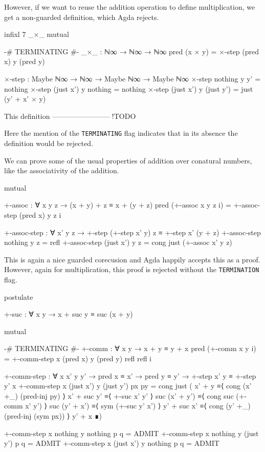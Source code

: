 However, if we want to reuse the addition operation to define multiplication, we get a non-guarded definition, which Agda rejects.

\begin{code}[hide]
infixl 7 _×_
mutual
\end{code}
\begin{code}
  {-# TERMINATING #-}
  _×_ : ℕ∞ → ℕ∞ → ℕ∞
  pred (x × y) = ×-step (pred x) y (pred y)

  ×-step :
    Maybe ℕ∞ → ℕ∞ → Maybe ℕ∞ → Maybe ℕ∞
  ×-step nothing    y y'         = nothing
  ×-step (just x')  y nothing    = nothing
  ×-step (just x')  y (just y')  = just (y' + x' × y)
\end{code}

This definition ------------------------ !TODO

Here the mention of the \texttt{TERMINATING} flag indicates that in its absence the definition would be rejected.

We can prove some of the usual properties of addition over conatural numbers, like the associativity of the addition.

\begin{code}[hide]
mutual
\end{code}
\begin{code}
  +-assoc : ∀ x y z → (x + y) + z ≡ x + (y + z)
  pred (+-assoc x y z i) = +-assoc-step (pred x) y z i

  +-assoc-step :
    ∀ x' y z →
    +-step (+-step x' y) z ≡ +-step x' (y + z)
  +-assoc-step nothing    y z = refl
  +-assoc-step (just x')  y z = cong just (+-assoc x' y z)
\end{code}

This is again a nice guarded corecusion and Agda happily accepts this as a proof. However, again for multiplication, this proof is rejected without the \texttt{TERMINATION} flag.

\begin{code}[hide]
postulate
\end{code}
\begin{code}
  +-suc : ∀ x y → x + suc y ≡ suc (x + y)
\end{code}

\begin{code}[hide]
mutual
\end{code}
\begin{code}
  {-# TERMINATING #-}
  +-comm : ∀ x y → x + y ≡ y + x
  pred (+-comm x y i) =
    +-comm-step x (pred x) y (pred y) refl refl i

  +-comm-step :
    ∀ x x' y y' → pred x ≡ x' → pred y ≡ y' →
    +-step x' y ≡ +-step y' x
  +-comm-step x (just x') y (just y') px py =
    cong just
      ( x' + y         ≡⟨ cong (x' +_) (pred-inj py) ⟩
        x' + suc y'    ≡⟨ +-suc x' y' ⟩
        suc (x' + y')  ≡⟨ cong suc (+-comm x' y') ⟩
        suc (y' + x')  ≡⟨ sym (+-suc y' x') ⟩
        y' + suc x'    ≡⟨ cong (y' +_) (pred-inj (sym px)) ⟩
        y' + x         ∎)
\end{code}
\begin{code}[hide]
  +-comm-step x nothing y nothing p q = ADMIT
  +-comm-step x nothing y (just y') p q = ADMIT
  +-comm-step x (just x') y nothing p q = ADMIT
\end{code}

